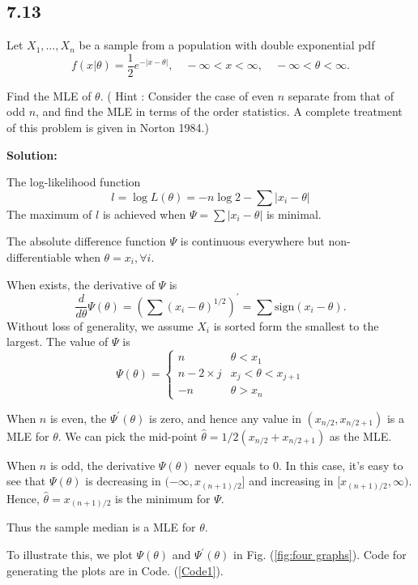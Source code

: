 \documentclass[11pt]{article}
\newcommand{\Sol}{\par {\bf Solution:}}
\newcommand{\sample}[1]{#1_1 , \dots , #1_n}
\begin{document}
\subsection*{7.13}
Let $\sample{X}$ be a sample from a population with double exponential pdf
\[
f(x|\theta) = \frac{1}{2}e^{-|x-\theta|}, \quad -\infty < x < \infty, \quad -\infty < \theta < \infty.
\]

Find the MLE of $\theta$. ( Hint : Consider the case of even $n$ separate from that of odd $n$, and find the MLE in terms of the order statistics. A complete treatment of this problem is given in Norton 1984.)

\Sol

The log-likelihood function 
\[
l = \log L(\theta) = -n\log 2 - \sum |x_i - \theta|
\]
The maximum of $l$ is achieved when $\Psi = \sum |x_i - \theta|$ is minimal.

The absolute difference function $\Psi$ is continuous everywhere but non-differentiable when $\theta = x_i, \forall i$.

When exists, the derivative of $\Psi$ is 
\[
\frac{d}{d\theta}\Psi(\theta) = (\sum (x_i - \theta)^{1/2})^{'} = \sum \text{sign}(x_i - \theta).
\]
Without loss of generality, we assume $X_i$ is sorted form the smallest to the largest. The value of $\Psi$ is
\[
\Psi(\theta) = \begin{cases}
    n & \theta < x_1 \\
    n - 2\times j & x_j < \theta < x_{j+1} \\
    -n & \theta > x_n
\end{cases}
\]

When $n$ is even, the $\Psi^{'}(\theta)$ is zero, and hence any value in $(x_{n/2}, x_{n/2+1})$ is a MLE for $\theta$. We can pick the mid-point $\hat{\theta} = 1/2(x_{n/2} + x_{n/2+1})$ as the MLE.

When $n$ is odd, the derivative $\Psi(\theta)$ never equals to 0. In this case, it's easy to see that $\Psi(\theta)$ is decreasing in $(-\infty, x_{(n+1)/2}]$ and increasing in $[x_{(n+1)/2}, \infty)$. Hence, $\hat \theta = x_{(n+1)/2}$ is the minimum for $\Psi$.

Thus the sample median is a MLE for $\theta$.

To illustrate this, we plot $\Psi(\theta)$ and $\Psi^{'}(\theta)$ in Fig. (\ref{fig:four graphs}). Code for generating the plots are in Code. (\ref{Code1}).


\end{document}
